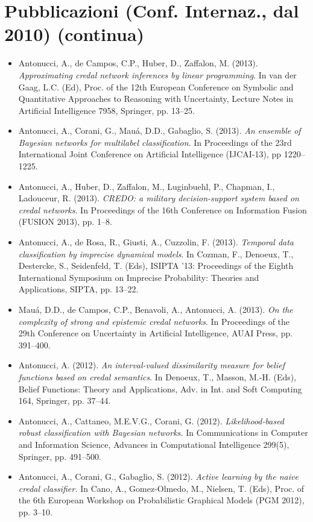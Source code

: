 \documentclass[12pt,a4paper]{moderncv}
\begin{document}
\section{Pubblicazioni (Conf. Internaz., dal 2010) (continua)}
\begin{itemize}
\item Antonucci, A., de Campos, C.P., Huber, D., Zaffalon, M. (2013). \textit{Approximating credal network inferences by linear programming}. In van der Gaag, L.C. (Ed), Proc. of the 12th European Conference on Symbolic and Quantitative Approaches to Reasoning with Uncertainty, Lecture Notes in Artificial Intelligence 7958, Springer, pp. 13--25.
\item Antonucci, A., Corani, G., Mau\'a, D.D., Gabaglio, S. (2013). \textit{An ensemble of Bayesian networks for multilabel classification}. In Proceedings of the 23rd International Joint Conference on Artificial Intelligence (IJCAI-13), pp 1220--1225.
\item Antonucci, A., Huber, D., Zaffalon, M., Luginbuehl, P., Chapman, I., Ladouceur, R. (2013). \textit{CREDO: a military decision-support system based on credal networks}. In Proceedings of the 16th Conference on Information Fusion (FUSION 2013), pp. 1--8.
\item Antonucci, A., de Rosa, R., Giusti, A., Cuzzolin, F. (2013). \textit{Temporal data classification by imprecise dynamical models}. In Cozman, F., Denoeux, T., Destercke, S., Seidenfeld, T. (Eds), ISIPTA '13: Proceedings of the Eighth International Symposium on Imprecise Probability: Theories and Applications, SIPTA, pp. 13--22.
\item Mau\'a, D.D., de Campos, C.P., Benavoli, A., Antonucci, A. (2013). \textit{On the complexity of strong and epistemic credal networks}. In Proceedings of the 29th Conference on Uncertainty in Artificial Intelligence, AUAI Press, pp. 391--400.
\item Antonucci, A. (2012). \textit{An interval-valued dissimilarity measure for belief functions based on credal semantics}. In Denoeux, T., Masson, M.-H. (Eds), Belief Functions: Theory and Applications, Adv. in Int. and Soft Computing 164, Springer, pp. 37--44.
\item Antonucci, A., Cattaneo, M.E.V.G., Corani, G. (2012). \textit{Likelihood-based robust classification with Bayesian networks.} In Communications in Computer and Information Science, Advances in Computational Intelligence 299(5), Springer, pp. 491--500.
\item Antonucci, A., Corani, G., Gabaglio, S. (2012). \textit{Active learning by the naive credal classifier.} In Cano, A., Gomez-Olmedo, M., Nielsen, T. (Eds), Proc. of the 6th European Workshop on Probabilistic Graphical Models (PGM 2012), pp. 3--10.

\end{itemize}
\end{document}
